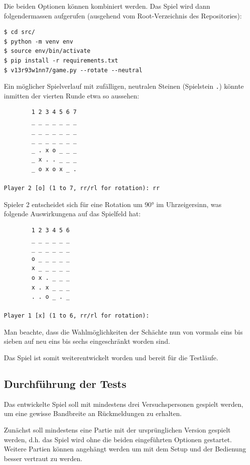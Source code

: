 \documentclass[a4paper,11pt,hidelinks]{scrartcl}
\begin{document}
Die beiden Optionen können kombiniert werden. Das Spiel wird dann folgendermassen aufgerufen (ausgehend vom Root-Verzeichnis des Repositories):

\begin{lstlisting}
$ cd src/
$ python -m venv env
$ source env/bin/activate
$ pip install -r requirements.txt
$ v13r93w1nn7/game.py --rotate --neutral
\end{lstlisting}

Ein möglicher Spielverlauf mit zufälligen, neutralen Steinen (Spielstein \texttt{.}) könnte inmitten der vierten Runde etwa so aussehen:

\begin{lstlisting}
        1 2 3 4 5 6 7
        _ _ _ _ _ _ _
        _ _ _ _ _ _ _
        _ _ _ _ _ _ _
        _ . x o _ _ _
        _ x . . _ _ _
        _ o x o x _ .

Player 2 [o] (1 to 7, rr/rl for rotation): rr
\end{lstlisting}

Spieler 2 entscheidet sich für eine Rotation um 90° im Uhrzeigersinn, was folgende Auswirkungena auf das Spielfeld hat:

\begin{lstlisting}
        1 2 3 4 5 6
        _ _ _ _ _ _
        _ _ _ _ _ _
        o _ _ _ _ _
        x _ _ _ _ _
        o x . _ _ _
        x . x _ _ _
        . . o _ . _

Player 1 [x] (1 to 6, rr/rl for rotation):
\end{lstlisting}

Man beachte, dass die Wahlmöglichkeiten der Schächte nun von vormals eins bis sieben auf neu eins bis sechs eingeschränkt worden sind.

Das Spiel ist somit weiterentwickelt worden und bereit für die Testläufe.

\subsection{Durchführung der Tests}

Das entwickelte Spiel soll mit mindestens drei Versuchspersonen gespielt werden, um eine gewisse Bandbreite an Rückmeldungen zu erhalten.

Zunächst soll mindestens eine Partie mit der ursprünglichen Version gespielt werden, d.h. das Spiel wird ohne die beiden eingeführten Optionen gestartet. Weitere Partien können angehängt werden um mit dem Setup und der Bedienung besser vertraut zu werden.
\end{document}
